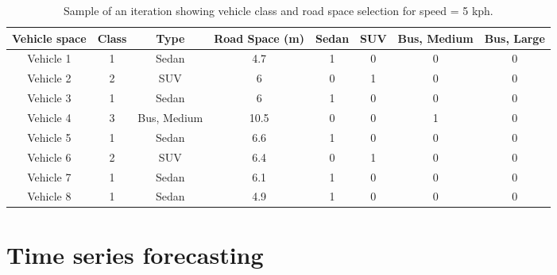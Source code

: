 \begin{table}[]
\centering
\caption{Sample of an iteration showing vehicle class and road space selection for speed = 5 kph.}
\label{tb3:selection}
\begin{tabular}{@{}cccccccc@{}}
\toprule
\textbf{Vehicle space} & \textbf{Class} & \textbf{Type} & \textbf{Road Space (m)} & \textbf{Sedan} & \textbf{SUV} & \textbf{Bus, Medium} & \textbf{Bus, Large} \\ \midrule
Vehicle 1 & 1 & Sedan & 4.7 & 1 & 0 & 0 & 0 \\
Vehicle 2 & 2 & SUV & 6 & 0 & 1 & 0 & 0 \\
Vehicle 3 & 1 & Sedan & 6 & 1 & 0 & 0 & 0 \\
Vehicle 4 & 3 & Bus, Medium & 10.5 & 0 & 0 & 1 & 0 \\
Vehicle 5 & 1 & Sedan & 6.6 & 1 & 0 & 0 & 0 \\
Vehicle 6 & 2 & SUV & 6.4 & 0 & 1 & 0 & 0 \\
Vehicle 7 & 1 & Sedan & 6.1 & 1 & 0 & 0 & 0 \\
Vehicle 8 & 1 & Sedan & 4.9 & 1 & 0 & 0 & 0 \\ \bottomrule
\end{tabular}
\end{table}

\section{Time series forecasting}

